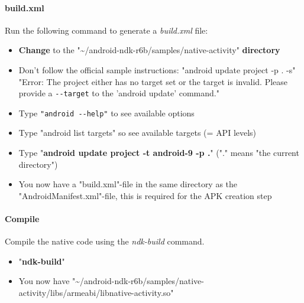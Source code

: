 \paragraph{build.xml}
Run the following command to generate a \emph{build.xml} file:
\begin{itemize}
\item{\textbf{Change} to the "\textasciitilde /android-ndk-r6b/samples/native-activity" \textbf{directory}}
\item{\textrightarrow{} Don't follow the official sample instructions: "android update project -p . -s" \textrightarrow{} "Error: The project either has no target set or the target is invalid. Please provide a \verb+--target+ to the 'android update' command."}
\item{\textrightarrow{} Type \verb+"android --help"+ to see available options}
\item{\textrightarrow{} Type "android list targets" so see available targets (= \ac{API} levels)}
\item{Type "\textbf{android update project -t android-9 -p .}" ("." means "the current directory")}
\item{\textrightarrow{} You now have a "build.xml"-file in the same directory as the "AndroidManifest.xml"-file, this is required for the \ac{APK} creation step}
\end{itemize}


\paragraph{Compile}
Compile the native code using the \emph{ndk-build} command.
\begin{itemize}
\item{"\textbf{ndk-build}"}
\item{\textrightarrow{} You now have "\textasciitilde /android-ndk-r6b/samples/native-activity/libs/armeabi/libnative-activity.so"}
\end{itemize}


